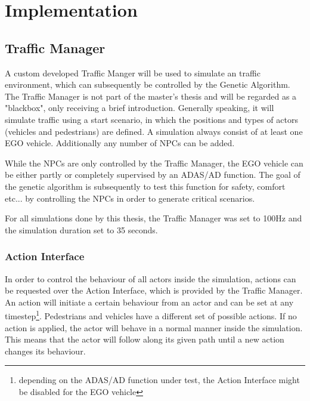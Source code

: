 \chapter{Implementation}
\label{chap:implementation}
\section{Traffic Manager}
A custom developed Traffic Manger will be used to simulate an traffic environment, which can subsequently be controlled by the Genetic Algorithm. The Traffic Manager is not part of the master's thesis and will be regarded as a "blackbox", only receiving a brief introduction.
Generally speaking, it will simulate traffic using a start scenario, in which the positions and types of actors (vehicles and pedestrians) are defined. 
A simulation always consist of at least one EGO vehicle. Additionally any number of NPCs can be added.

While the NPCs are only controlled by the Traffic Manager, the EGO vehicle can be either partly or completely supervised by an ADAS/AD function. The goal of the genetic algorithm is subsequently to test this function for safety, comfort etc... by controlling the NPCs in order to generate critical scenarios.

For all simulations done by this thesis, the Traffic Manager was set to 100Hz and the simulation duration set to 35 seconds.

\subsection{Action Interface}
\label{sect:implementation:action_interface}
In order to control the behaviour of all actors inside the simulation, actions can be requested over the Action Interface, which is provided by the Traffic Manager. An action will initiate a certain behaviour from an actor and can be set at any timestep\footnote{depending on the ADAS/AD function under test, the Action Interface might be disabled for the EGO vehicle}. Pedestrians and vehicles have a different set of possible actions. If no action is applied, the actor will behave in a normal manner inside the simulation. This means that the actor will follow along its given path until a new action changes its behaviour.

